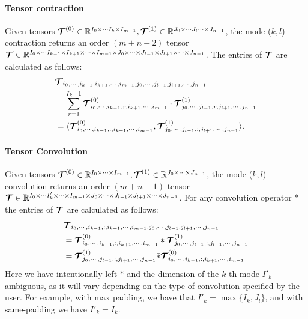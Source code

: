 

\paragraph{Tensor contraction} 
Given tensors $\bm{\mathcal{T}}^{(0)}\in\mathbb{R}^{I_0 \times \cdots I_k \times I_{m-1}}, \bm{\mathcal{T}}^{(1)}\in\mathbb{R}^{J_0 \times \cdots J_l  \cdots \times J_{n-1}}$, the mode-($k,l$) contraction returns an order $(m+n-2)$ tensor \\$\bm{\mathcal{T}}\in\mathbb{R}^{I_0\times\cdots I_{k-1} \times I_{k+1}\times \cdots \times I_{m-1}\times J_0 \times \cdots \times J_{l-1}\times J_{l+1}\times\cdots\times J_{n-1} }$. The entries of $\bm{\mathcal{T}}$ are calculated as follows: 
\begin{align*}
&\bm{\mathcal{T}}_{i_0, \cdots, i_{k-1}, i_{k+1}, \cdots, i_{m-1}, j_0, \cdots, j_{l-1}, j_{l+1}, \cdots, j_{n-1}}\\ &=\sum_{r=1}^{I_k-1}\bm{\mathcal{T}}^{(0)}_{i_0, \cdots, i_{k-1},r, i_{k+1}, \cdots, i_{m-1}}\cdot  \bm{\mathcal{T}}^{(1)}_{j_0, \cdots, j_{l-1}, r, j_{l+1}, \cdots, j_{n-1}}\\
&=\langle \bm{\mathcal{T}}^{(0)}_{i_0, \cdots, i_{k-1},{ :}, i_{k+1}, \cdots, i_{m-1}},  \bm{\mathcal{T}}^{(1)}_{j_0, \cdots, j_{l-1}, {:}, j_{l+1}, \cdots, j_{n-1}}\rangle.
\end{align*}

\paragraph{Tensor Convolution} 
Given tensors $\bm{\mathcal{T}}^{(0)}\in\mathbb{R}^{I_0\times \cdots \times I_{m-1}}, \bm{\mathcal{T}}^{(1)}\in\mathbb{R}^{J_0 \times \cdots \times J_{n-1}}$, the mode-($k,l$) convolution returns an order $(m+n-1)$ tensor \\$\bm{\mathcal{T}}\in\mathbb{R}^{I_0\times\cdots I'_k \times \cdots \times I_{m-1}\times J_0 \times \cdots \times J_{l-1}\times J_{l+1}\times\cdots\times J_{n-1}}$. For any convolution operator * the entries of $\bm{\mathcal{T}}$ are calculated as follows:
\begin{align*}
& \bm{\mathcal{T}}_{i_0, \cdots, i_{k-1}, {:}, i_{k+1}, \cdots, i_{m-1}, j_0, \cdots, j_{l-1}, j_{l+1}, \cdots, j_{n-1}} \\
	&= \bm{\mathcal{T}}^{(0)}_{i_0, \cdots, i_{k-1}, {:}, i_{k+1}, \cdots, i_{m-1}} \ast \bm{\mathcal{T}}^{(1)}_{j_0, \cdots, j_{l-1},{ :}, j_{l+1}, \cdots, j_{n-1}}\\
	&= \bm{\mathcal{T}}^{(1)}_{j_0, \cdots, j_{l-1},{ :}, j_{l+1}, \cdots, j_{n-1}} \bar{\ast} \bm{\mathcal{T}}^{(0)}_{i_0, \cdots, i_{k-1}, {:}, i_{k+1}, \cdots, i_{m-1}}
\end{align*}
Here we have intentionally left $\ast$ and the dimension of the $k$-th mode $I'_k$ ambiguous, as it will vary depending on the type of convolution specified by the user. For example, with max padding, we have that $I'_k=\max\{I_k,J_l\}$, and with same-padding we have $I'_k=I_k$. 

